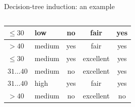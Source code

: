 \documentclass[aspectratio=169,t,table]{beamer}
\begin{document}
{\begin{frame}{Decision-tree induction: an example}
\begin{columns}
\begin{column}{0.6\textwidth}
\begin{tabular}{|l|l|c|c|c|}
            \cellcolor{yellow!20}$\leq 30$ & \cellcolor{yellow!20}low & \cellcolor{yellow!20}no & \cellcolor{yellow!20}fair & \cellcolor{green!20}yes \\\hline
            \cellcolor{yellow!20}$>40$ & \cellcolor{yellow!20}medium & \cellcolor{yellow!20}yes & \cellcolor{yellow!20}fair & \cellcolor{green!20}yes \\\hline
            \cellcolor{yellow!20}$\leq 30$ & \cellcolor{yellow!20}medium & \cellcolor{yellow!20}yes & \cellcolor{yellow!20}excellent & \cellcolor{green!20}yes \\\hline
            \cellcolor{yellow!20}$31\ldots40$ & \cellcolor{yellow!20}medium & \cellcolor{yellow!20}no & \cellcolor{yellow!20}excellent & \cellcolor{green!20}yes \\\hline
            \cellcolor{yellow!20}$31\ldots40$ & \cellcolor{yellow!20}high & \cellcolor{yellow!20}yes & \cellcolor{yellow!20}fair & \cellcolor{green!20}yes \\\hline
            \cellcolor{yellow!20}$>40$ & \cellcolor{yellow!20}medium & \cellcolor{yellow!20}no & \cellcolor{yellow!20}excellent & \cellcolor{red!20}no \\\hline
          \end{tabular}
        \end{column}
      \end{columns}
    \end{frame}
  }
\end{document}
